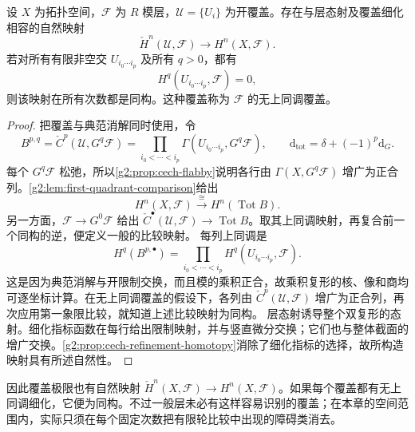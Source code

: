\begin{theorem}\label{g2:thm:leray-cover}
	设 \(X\) 为拓扑空间，\(\mathcal F\) 为 \(R\) 模层，\(\mathcal U=\{U_i\}\) 为开覆盖。存在与层态射及覆盖细化相容的自然映射
	\[
		\check H^n(\mathcal U,\mathcal F)\longrightarrow H^n(X,\mathcal F).
	\]
	若对所有有限非空交 \(U_{i_0\cdots i_p}\) 及所有 \(q>0\)，都有
	\[
		H^q(U_{i_0\cdots i_p},\mathcal F)=0,
	\]
	则该映射在所有次数都是同构。这种覆盖称为 \(\mathcal F\) 的无上同调覆盖。
\end{theorem}
\begin{proof}
	把覆盖与典范消解同时使用，令
	\[
		B^{p,q}=\check C^p(\mathcal U,G^q\mathcal F)
		=\prod_{i_0<\cdots<i_p}\Gamma(U_{i_0\cdots i_p},G^q\mathcal F),
		\qquad \mathrm d_{\mathrm{tot}}=\delta+(-1)^p\mathrm d_G.
	\]
	每个 \(G^q\mathcal F\) 松弛，所以\cref{g2:prop:cech-flabby}说明各行由 \(\Gamma(X,G^q\mathcal F)\) 增广为正合列。\cref{g2:lem:first-quadrant-comparison}给出
	\[
		H^n(X,\mathcal F)\xrightarrow{\ \cong\ }H^n(\operatorname{Tot}B).
	\]
	另一方面，\(\mathcal F\to G^0\mathcal F\) 给出 \(\check C^\bullet(\mathcal U,\mathcal F)\to\operatorname{Tot}B\)。取其上同调映射，再复合前一个同构的逆，便定义一般的比较映射。
	每列上同调是
	\[
		H^q(B^{p,\bullet})=\prod_{i_0<\cdots<i_p}H^q(U_{i_0\cdots i_p},\mathcal F).
	\]
	这是因为典范消解与开限制交换，而且模的乘积正合，故乘积复形的核、像和商均可逐坐标计算。在无上同调覆盖的假设下，各列由 \(\check C^p(\mathcal U,\mathcal F)\) 增广为正合列，再次应用第一象限比较，就知道上述比较映射为同构。
	层态射诱导整个双复形的态射。细化指标函数在每行给出限制映射，并与竖直微分交换；它们也与整体截面的增广交换。\cref{g2:prop:cech-refinement-homotopy}消除了细化指标的选择，故所构造映射具有所述自然性。
\end{proof}

因此覆盖极限也有自然映射 \(\check H^n(X,\mathcal F)\to H^n(X,\mathcal F)\)。如果每个覆盖都有无上同调细化，它便为同构。不过一般层未必有这样容易识别的覆盖；在本章的空间范围内，实际只须在每个固定次数把有限轮比较中出现的障碍类消去。

